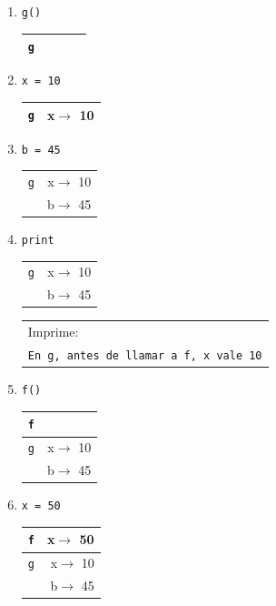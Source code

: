 \begin{enumerate}

\item  \verb|g()   | \hspace{1.5cm}
	\begin{tabular}{r|r|}
	\hline
	\verb|g|&\verb!     !\\
	\hline
	\end{tabular}

\item  \verb|x = 10| \hspace{1.5cm}
	\begin{tabular}{r|r|}
	\hline
	\verb|g|& x$\rightarrow$ 10 \\
	\hline
	\end{tabular}

\item  \verb|b = 45| \hspace{1.5cm}
	\begin{tabular}{r|r|}
	\hline
	\verb|g|& x$\rightarrow$ 10 \\
	        & b$\rightarrow$ 45 \\
	\hline
	\end{tabular}

\item  \verb|print | \hspace{1.5cm}
	\begin{tabular}{r|r|}
	\hline
	\verb|g|& x$\rightarrow$ 10 \\
	             & b$\rightarrow$ 45 \\
	\hline
	\end{tabular}
	\hspace{1cm}
	\begin{tabular}{l}
	Imprime: \\
	{\tt En g, antes de llamar a f, x vale 10}
	\end{tabular}

\item  \verb|f()   | \hspace{1.5cm}
	\begin{tabular}{r|r|}
	\hline
	\verb|f|&\\
	\hline
	\hline
	\verb|g|& x$\rightarrow$ 10 \\
	        & b$\rightarrow$ 45 \\
	\hline
	\end{tabular}

\item  \verb|x = 50| \hspace{1.5cm}
	\begin{tabular}{r|r|}
	\hline
	\verb|f|& x$\rightarrow$ 50 \\
	\hline
	\hline
	\verb|g|& x$\rightarrow$ 10 \\
	             & b$\rightarrow$ 45 \\
	\hline
	\end{tabular}


\end{enumerate}
